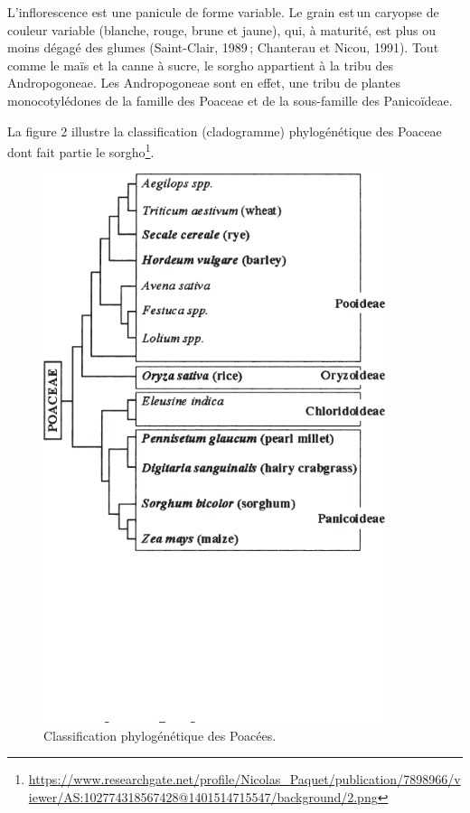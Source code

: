 \documentclass[a4paper,11pt]{article}
\begin{document}
\newpage



L’inflorescence est une panicule de forme variable. Le grain est\,un
caryopse de couleur variable (blanche, rouge, brune et jaune), qui, à
maturité, est plus ou moins dégagé des glumes (Saint-Clair, 1989\,;
Chanterau et Nicou, 1991).  Tout comme le maïs et la canne à sucre, le
sorgho appartient à la tribu des Andropogoneae. Les Andropogoneae sont
en effet, une tribu de plantes monocotylédones de la famille des
Poaceae et de la sous-famille des Panicoïdeae.

La figure 2 illustre la classification (cladogramme) phylogénétique des Poaceae dont fait
partie le sorgho\footnote{\url{https://www.researchgate.net/profile/Nicolas_Paquet/publication/7898966/viewer/AS:102774318567428@1401514715547/background/2.png}}.



\begin{figure}%
  \begin{center}
    \includegraphics[width=10cm]{images/PoaceaePhylogeny}
  \end{center}
\caption{Classification phylogénétique des Poacées.}
\end{figure}
\end{document}
